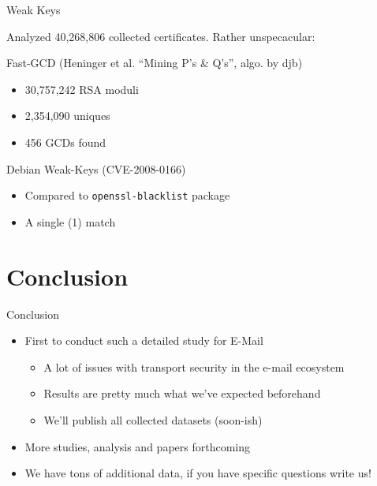 \begin{frame}{Weak Keys}

Analyzed 40,268,806 collected certificates. Rather unspecacular:

\begin{block}{Fast-GCD (Heninger et al. ``Mining P's \& Q's'', algo. by
djb)}

\begin{itemize}
\itemsep1pt\parskip0pt
\item
  30,757,242 RSA moduli
\item
  2,354,090 uniques
\item
  456 GCDs found
\end{itemize}

\end{block}

\begin{block}{Debian Weak-Keys (CVE-2008-0166)}

\begin{itemize}
\itemsep1pt\parskip0pt
\item
  Compared to \texttt{openssl-blacklist} package
\item
  A single (1) match
\end{itemize}

\end{block}

\end{frame}

\section{Conclusion}\label{conclusion}

\begin{frame}{Conclusion}

\begin{itemize}
\itemsep1pt\parskip0pt
\item
  First to conduct such a detailed study for E-Mail

  \begin{itemize}
  \itemsep1pt\parskip0pt
  \item
    A lot of issues with transport security in the e-mail ecosystem
  \item
    Results are pretty much what we've expected beforehand
  \item
    We'll publish all collected datasets (soon-ish)
  \end{itemize}
\item
  More studies, analysis and papers forthcoming
\item
  We have tons of additional data, if you have specific questions write
  us!
\end{itemize}

\end{frame}
